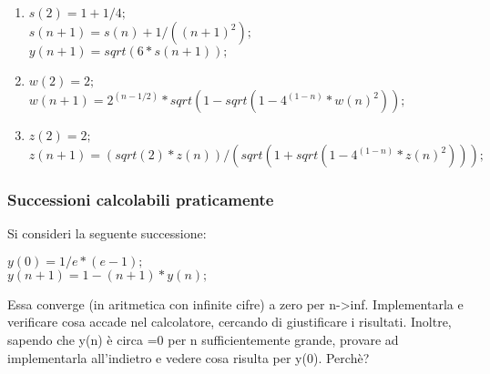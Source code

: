 \begin{enumerate}
	\item $s(2)=1+1/4;$ \\ $s(n+1)=s(n)+1/((n+1)^2);$ \\ $y(n+1)= sqrt(6*s(n+1));$
	\item $w(2)=2;$ \\ $w(n+1)=2^(n-1/2)*sqrt(1-sqrt(1-4^(1-n)*w(n)^2));$
	\item $z(2)=2;$ \\ $z(n+1)=(sqrt(2)*z(n))/(sqrt(1+sqrt(1-4^(1-n)*z(n)^2)));$
\end{enumerate}



\subsubsection{Successioni calcolabili praticamente}

Si consideri la seguente successione:

\begin{center}
	$y(0)=1/e*(e-1);$
	\\
	$y(n+1)=1-(n+1)*y(n);$
\end{center}

Essa converge (in aritmetica con infinite cifre) a zero per n->inf. Implementarla e verificare cosa accade nel calcolatore, cercando di giustificare i risultati. Inoltre, sapendo che y(n) è circa =0 per n sufficientemente grande, provare ad implementarla all'indietro e vedere cosa risulta per y(0). Perchè?

